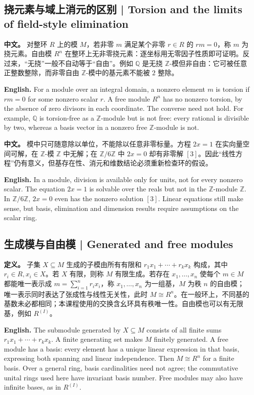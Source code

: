 \documentclass[UTF8,11pt,a4paper]{ctexart}
\newcommand{\EN}[1]{\par\noindent\textbf{English.} #1\par}
\newcommand{\APS}[2]{\par\noindent\textbf{中文。} #1\par\noindent\textbf{English.} #2\par\smallskip}
\begin{document}
\subsection{挠元素与域上消元的区别 | Torsion and the limits of field-style elimination}
\APS{对整环 $R$ 上的模 $M$，若非零 $m$ 满足某个非零 $r\in R$ 的 $rm=0$，称 $m$ 为挠元素。自由模 $R^n$ 在整环上无非零挠元素：逐坐标用无零因子性质即可证明。反过来，“无挠”一般不自动等于“自由”。例如 $\mathbb Q$ 是无挠 $\mathbb Z$-模但非自由：它可被任意正整数整除，而非零自由 $\mathbb Z$-模中的基元素不能被 $2$ 整除。}{For a module over an integral domain, a nonzero element $m$ is torsion if $rm=0$ for some nonzero scalar $r$. A free module $R^n$ has no nonzero torsion, by the absence of zero divisors in each coordinate. The converse need not hold. For example, $\mathbb Q$ is torsion-free as a $\mathbb Z$-module but is not free: every rational is divisible by two, whereas a basis vector in a nonzero free $\mathbb Z$-module is not.}
\APS{模中只可随意除以单位，不能除以任意非零标量。方程 $2x=1$ 在实向量空间可解，在 $\mathbb Z$-模 $\mathbb Z$ 中无解；在 $\mathbb Z/6\mathbb Z$ 中 $2x=0$ 却有非零解 $[3]$。因此“线性方程”仍有意义，但基存在性、消元和维数结论必须重新检查环的假设。}{In a module, division is available only for units, not for every nonzero scalar. The equation $2x=1$ is solvable over the reals but not in the $\mathbb Z$-module $\mathbb Z$. In $\mathbb Z/6\mathbb Z$, $2x=0$ even has the nonzero solution $[3]$. Linear equations still make sense, but basis, elimination and dimension results require assumptions on the scalar ring.}

\subsection{生成模与自由模 | Generated and free modules}
\noindent\textbf{定义。} 子集 $X\subseteq M$ 生成的子模由所有有限和 $r_1x_1+\cdots+r_kx_k$ 构成，其中 $r_i\in R,x_i\in X$。若 $X$ 有限，则称 $M$ 有限生成。若存在 $x_1,\ldots,x_n$ 使每个 $m\in M$ 都能唯一表示成 $m=\sum_{i=1}^n r_i x_i$，称 $x_1,\ldots,x_n$ 为一组基，$M$ 为秩 $n$ 的自由模；唯一表示同时表达了张成性与线性无关性，此时 $M\cong R^n$。在一般环上，不同基的基数未必都相同；本课程使用的交换含幺环具有秩唯一性。自由模也可以有无限基，例如 $R^{(I)}$。

\EN{The submodule generated by $X\subseteq M$ consists of all finite sums $r_1x_1+\cdots+r_kx_k$. A finite generating set makes $M$ finitely generated. A free module has a basis: every element has a unique linear expression in that basis, expressing both spanning and linear independence. Then $M\cong R^n$ for a finite basis. Over a general ring, basis cardinalities need not agree; the commutative unital rings used here have invariant basis number. Free modules may also have infinite bases, as in $R^{(I)}$.}
\end{document}
